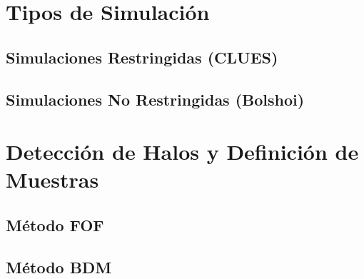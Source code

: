 \section{Tipos de Simulación}
\label{sec:Types of Simulations}


	\subsection{Simulaciones Restringidas (CLUES)}
	\label{subsec:ConstrainedSimulations}


	\subsection{Simulaciones No Restringidas (Bolshoi)}
	\label{subsec:UnconstrainedSimulations}





\section{Detección de Halos y Definición de Muestras}
\label{sec:HalosDetectionAndSampleDefinitions}


	\subsection{Método FOF}
	\label{subsec:FOFMethod}


	\subsection{Método BDM}
	\label{subsec:BDMMethod}
	

